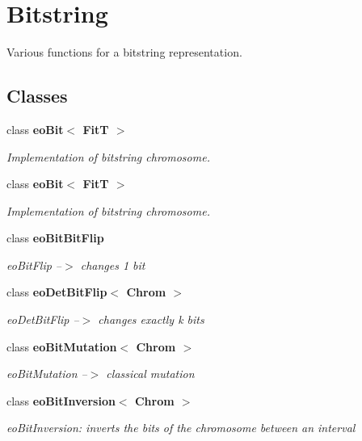 \section{Bitstring}
\label{group__bitstring}
Various functions for a bitstring representation.  
\subsection*{Classes}
\begin{CompactItemize}
\item 
class {\bf eo\-Bit$<$ Fit\-T $>$}
\begin{CompactList}\small\item\em Implementation of bitstring chromosome. \item\end{CompactList}\item 
class {\bf eo\-Bit$<$ Fit\-T $>$}
\begin{CompactList}\small\item\em Implementation of bitstring chromosome. \item\end{CompactList}\item 
class {\bf eo\-Bit\-Bit\-Flip}
\begin{CompactList}\small\item\em eo\-Bit\-Flip --$>$ changes 1 bit \item\end{CompactList}\item 
class {\bf eo\-Det\-Bit\-Flip$<$ Chrom $>$}
\begin{CompactList}\small\item\em eo\-Det\-Bit\-Flip --$>$ changes exactly k bits \item\end{CompactList}\item 
class {\bf eo\-Bit\-Mutation$<$ Chrom $>$}
\begin{CompactList}\small\item\em eo\-Bit\-Mutation --$>$ classical mutation \item\end{CompactList}\item 
class {\bf eo\-Bit\-Inversion$<$ Chrom $>$}
\begin{CompactList}\small\item\em eo\-Bit\-Inversion: inverts the bits of the chromosome between an interval \item\end{CompactList}\item 

\end{CompactItemize}
